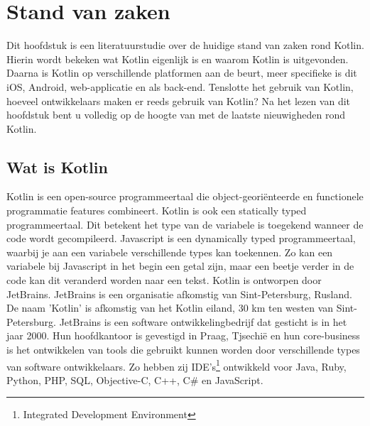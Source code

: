 \chapter{Stand van zaken}
\label{ch:stand-van-zaken}



Dit hoofdstuk is een literatuurstudie over de huidige stand van zaken rond Kotlin. Hierin wordt bekeken wat Kotlin eigenlijk is en waarom Kotlin is uitgevonden. Daarna is Kotlin op verschillende platformen aan de beurt, meer specifieke is dit iOS, Android, web-applicatie en als back-end. Tenslotte het gebruik van Kotlin, hoeveel ontwikkelaars maken er reeds gebruik van Kotlin? Na het lezen van dit hoofdstuk bent u volledig op de hoogte van met de laatste nieuwigheden rond Kotlin.

\section{Wat is Kotlin}
\label{sec:kotlin}
Kotlin is een open-source programmeertaal die object-georiënteerde en functionele programmatie features combineert. Kotlin is ook een statically typed programmeertaal. Dit betekent het type van de variabele is toegekend wanneer de code wordt gecompileerd. 
Javascript is een dynamically typed programmeertaal, waarbij je aan een variabele verschillende types kan toekennen. Zo kan een variabele bij Javascript in het begin een getal zijn, maar een beetje verder in de code kan dit veranderd worden naar een tekst.
\newline
\newline
Kotlin is ontworpen door JetBrains. JetBrains is een organisatie afkomstig van Sint-Petersburg, Rusland. De naam 'Kotlin' is afkomstig van het Kotlin eiland, 30 km ten westen van Sint-Petersburg. JetBrains is een software ontwikkelingbedrijf dat gesticht is in het jaar 2000. Hun hoofdkantoor is gevestigd in Praag, Tjsechië en hun core-business is het ontwikkelen van tools die gebruikt kunnen worden door verschillende types van software ontwikkelaars. Zo hebben zij IDE's\footnote{Integrated Development Environment} ontwikkeld voor Java, Ruby, Python, PHP, SQL, Objective-C, C++, C\# en JavaScript.

